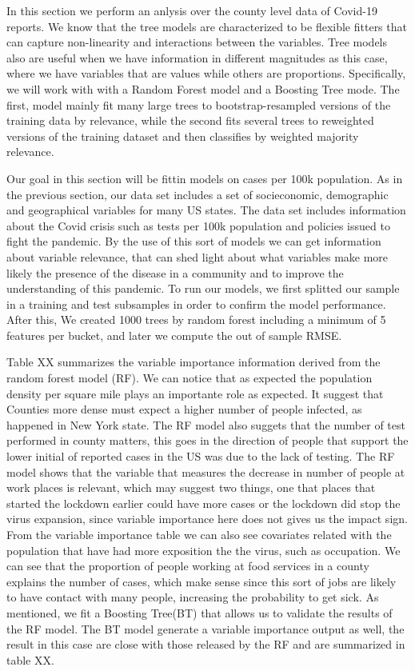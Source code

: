 \documentclass[
]{article}
\begin{document}
In this section we perform an anlysis over the county level data of
Covid-19 reports. We know that the tree models are characterized to be
flexible fitters that can capture non-linearity and interactions between
the variables. Tree models also are useful when we have information in
different magnitudes as this case, where we have variables that are
values while others are proportions. Specifically, we will work with
with a Random Forest model and a Boosting Tree mode. The first, model
mainly fit many large trees to bootstrap-resampled versions of the
training data by relevance, while the second fits several trees to
reweighted versions of the training dataset and then classifies by
weighted majority relevance.

Our goal in this section will be fittin models on cases per 100k
population. As in the previous section, our data set includes a set of
socieconomic, demographic and geographical variables for many US states.
The data set includes information about the Covid crisis such as tests
per 100k population and policies issued to fight the pandemic. By the
use of this sort of models we can get information about variable
relevance, that can shed light about what variables make more likely the
presence of the disease in a community and to improve the understanding
of this pandemic. To run our models, we first splitted our sample in a
training and test subsamples in order to confirm the model performance.
After this, We created 1000 trees by random forest including a minimum
of 5 features per bucket, and later we compute the out of sample RMSE.

Table XX summarizes the variable importance information derived from the
random forest model (RF). We can notice that as expected the population
density per square mile plays an importante role as expected. It suggest
that Counties more dense must expect a higher number of people infected,
as happened in New York state. The RF model also suggets that the number
of test performed in county matters, this goes in the direction of
people that support the lower initial of reported cases in the US was
due to the lack of testing. The RF model shows that the variable that
measures the decrease in number of people at work places is relevant,
which may suggest two things, one that places that started the lockdown
earlier could have more cases or the lockdown did stop the virus
expansion, since variable importance here does not gives us the impact
sign. From the variable importance table we can also see covariates
related with the population that have had more exposition the the virus,
such as occupation. We can see that the proportion of people working at
food services in a county explains the number of cases, which make sense
since this sort of jobs are likely to have contact with many people,
increasing the probability to get sick. As mentioned, we fit a Boosting
Tree(BT) that allows us to validate the results of the RF model. The BT
model generate a variable importance output as well, the result in this
case are close with those released by the RF and are summarized in table
XX.
\end{document}
